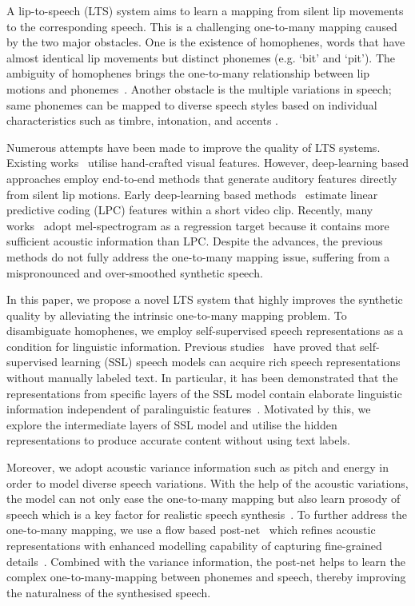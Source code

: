 \documentclass[letterpaper]{article} %
\begin{document}
A lip-to-speech (LTS) system aims to learn a mapping from silent lip movements to the corresponding speech. 
This is a challenging one-to-many mapping caused by the two major obstacles. 
One is the existence of homophenes, words that have almost identical lip movements but distinct phonemes (e.g. `bit' and `pit').
The ambiguity of homophenes brings the one-to-many relationship between lip motions and phonemes~\cite{son2017lip,kim2022distinguishing}.
Another obstacle is the multiple variations in speech; same phonemes can be mapped to diverse speech styles based on individual characteristics such as timbre, intonation, and accents \cite{elias2021parallel,kim2022fluenttts}.

Numerous attempts have been made to improve the quality of LTS systems.
Existing works~\cite{le2015reconstructing,le2017generating} utilise hand-crafted visual features. However, deep-learning based approaches employ end-to-end methods that generate auditory features directly from silent lip motions. 
Early deep-learning based methods~\cite{ephrat2017vid2speech,kumar2019lipper} estimate linear predictive coding (LPC) features within a short video clip. 
Recently, many works~\cite{prajwal2020learning, kim2021lip, yadav2021speech, he2022flow, mira2022svts, kim2023lip} adopt mel-spectrogram as a regression target because it contains more sufficient acoustic information than LPC.
Despite the advances, the previous methods do not fully address the one-to-many mapping issue, suffering from a mispronounced and over-smoothed synthetic speech.

In this paper, we propose a novel LTS system that highly improves the synthetic quality by alleviating the intrinsic one-to-many mapping problem. 
To disambiguate homophenes, we employ self-supervised speech representations as a condition for linguistic information. 
Previous studies~\cite{baevski2020wav2vec,hsu2021hubert} have proved that self-supervised learning (SSL) speech models can acquire rich speech representations without manually labeled text.
In particular, it has been demonstrated that the representations from specific layers of the SSL model contain elaborate linguistic information independent of paralinguistic features~\cite{yang21c_interspeech,chang2022distilhubert}. 
Motivated by this, we explore the intermediate layers of SSL model and utilise the hidden representations to produce accurate content without using text labels.

Moreover, we adopt acoustic variance information such as pitch and energy in order to model diverse speech variations. 
With the help of the acoustic variations, the model can not only ease the one-to-many mapping but also learn prosody of speech which is a key factor for realistic speech synthesis~\cite{skerry2018towards,sun2020fully}. 
To further address the one-to-many mapping, we use a flow based post-net~\cite{ren2021portaspeech} which refines acoustic representations with enhanced modelling capability of capturing fine-grained details~\cite{ren2022revisiting}.
Combined with the variance information, the post-net helps to learn the complex one-to-many-mapping between phonemes and speech, thereby improving the naturalness of the synthesised speech.
\end{document}
